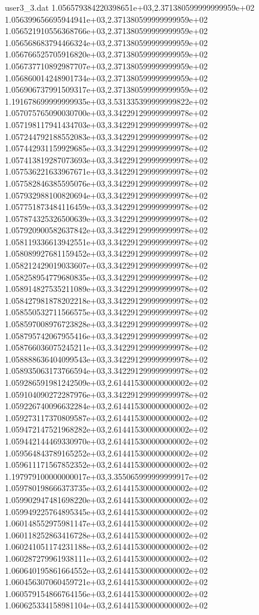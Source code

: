 \begin{filecontents}{user3_3.dat}
1.056579384220398651e+03,2.371380599999999959e+02
1.056399656695944941e+03,2.371380599999999959e+02
1.056521910556368766e+03,2.371380599999999959e+02
1.056568683794466324e+03,2.371380599999999959e+02
1.056766525705916820e+03,2.371380599999999959e+02
1.056737710892987707e+03,2.371380599999999959e+02
1.056860014248901734e+03,2.371380599999999959e+02
1.056906737991509317e+03,2.371380599999999959e+02
1.191678699999999935e+03,3.531335399999999822e+02
1.057075765090030700e+03,3.342291299999999978e+02
1.057198117941434703e+03,3.342291299999999978e+02
1.057244792188552083e+03,3.342291299999999978e+02
1.057442931159929685e+03,3.342291299999999978e+02
1.057413819287073693e+03,3.342291299999999978e+02
1.057536221633967671e+03,3.342291299999999978e+02
1.057582846385595076e+03,3.342291299999999978e+02
1.057932988100820694e+03,3.342291299999999978e+02
1.057751873484116459e+03,3.342291299999999978e+02
1.057874325326500639e+03,3.342291299999999978e+02
1.057920900582637842e+03,3.342291299999999978e+02
1.058119336613942551e+03,3.342291299999999978e+02
1.058089927681159452e+03,3.342291299999999978e+02
1.058212429019033607e+03,3.342291299999999978e+02
1.058258954779680835e+03,3.342291299999999978e+02
1.058914827535211089e+03,3.342291299999999978e+02
1.058427981878202218e+03,3.342291299999999978e+02
1.058550532711566575e+03,3.342291299999999978e+02
1.058597008976723828e+03,3.342291299999999978e+02
1.058795742067955416e+03,3.342291299999999978e+02
1.058766036075245211e+03,3.342291299999999978e+02
1.058888636404099543e+03,3.342291299999999978e+02
1.058935063173766594e+03,3.342291299999999978e+02
1.059286591981242509e+03,2.614415300000000002e+02
1.059104090272287976e+03,3.342291299999999978e+02
1.059226740096632284e+03,2.614415300000000002e+02
1.059273117370809587e+03,2.614415300000000002e+02
1.059472147521968282e+03,2.614415300000000002e+02
1.059442144469330970e+03,2.614415300000000002e+02
1.059564843789165252e+03,2.614415300000000002e+02
1.059611171567852352e+03,2.614415300000000002e+02
1.197979100000000017e+03,3.355065999999999917e+02
1.059780198666373735e+03,2.614415300000000002e+02
1.059902947481698220e+03,2.614415300000000002e+02
1.059949225764895345e+03,2.614415300000000002e+02
1.060148552975981147e+03,2.614415300000000002e+02
1.060118252863416728e+03,2.614415300000000002e+02
1.060241051174231188e+03,2.614415300000000002e+02
1.060287279961938111e+03,2.614415300000000002e+02
1.060640195861664552e+03,2.614415300000000002e+02
1.060456307060459721e+03,2.614415300000000002e+02
1.060579154866764156e+03,2.614415300000000002e+02
1.060625334158981104e+03,2.614415300000000002e+02

\end{filecontents}
